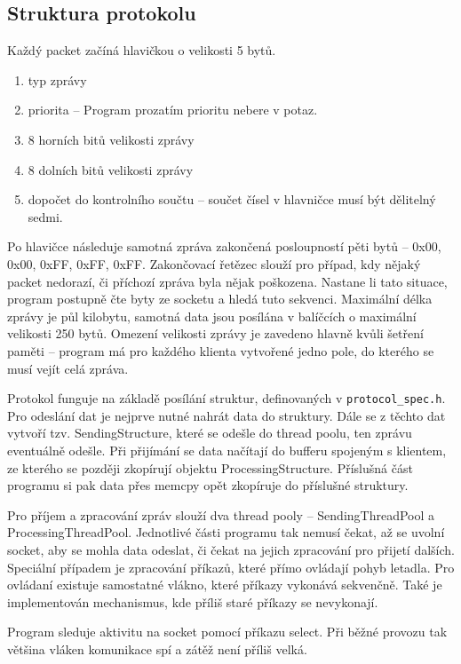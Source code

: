 \documentclass[a4paper,oneside,12pt]{report}
\begin{document}
\subsection{Struktura protokolu}

Každý packet začíná hlavičkou o velikosti 5 bytů.

\begin{enumerate}
  \item typ zprávy
  \item priorita -- Program prozatím prioritu nebere v potaz.
  \item 8 horních bitů velikosti zprávy
  \item 8 dolních bitů velikosti zprávy
  \item dopočet do kontrolního součtu -- součet čísel v hlavničce musí být dělitelný sedmi.
\end{enumerate}

Po hlavičce následuje samotná zpráva zakončená posloupností pěti bytů -- 0x00, 0x00, 0xFF, 0xFF, 0xFF.
Zakončovací řetězec slouží pro případ, kdy nějaký packet nedorazí, či příchozí zpráva byla nějak poškozena.
Nastane li tato situace, program postupně čte byty ze socketu a hledá tuto sekvenci.
Maximální délka zprávy je půl kilobytu, samotná data jsou posílána v balíčcích o maximální velikosti 250 bytů.
Omezení velikosti zprávy je zavedeno hlavně kvůli šetření paměti -- program má pro každého klienta vytvořené jedno pole, do kterého se musí vejít celá zpráva.

Protokol funguje na základě posílání struktur, definovaných v \verb|protocol_spec.h|.
Pro odeslání dat je nejprve nutné nahrát data do struktury.
Dále se z těchto dat vytvoří tzv. SendingStructure, které se odešle do thread poolu, ten zprávu eventuálně odešle.
Při přijímání se data načítají do bufferu spojeným s klientem, ze kterého se později zkopírují objektu ProcessingStructure.
Příslušná část programu si pak data přes memcpy opět zkopíruje do příslušné struktury.

Pro příjem a zpracování zpráv slouží dva thread pooly -- SendingThreadPool a ProcessingThreadPool.
Jednotlivé části programu tak nemusí čekat, až se uvolní socket, aby se mohla data odeslat, či čekat na jejich zpracování pro přijetí dalších.
Speciální případem je zpracování příkazů, které přímo ovládají pohyb letadla.
Pro ovládaní existuje samostatné vlákno, které příkazy vykonává sekvenčně.
Také je implementován mechanismus, kde příliš staré příkazy se nevykonají.

Program sleduje aktivitu na socket pomocí příkazu select.
Při běžné provozu tak většina vláken komunikace spí a zátěž není příliš velká.
\end{document}
